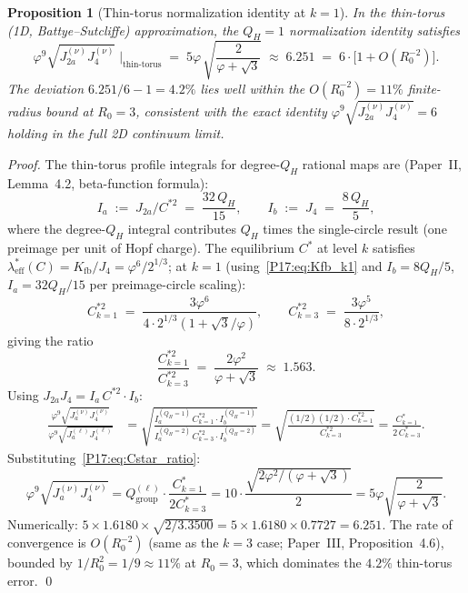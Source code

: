 \documentclass[11pt,a4paper]{article}
\newtheorem{proposition}[theorem]{Proposition}
\theoremstyle{definition}\newtheorem{definition}[theorem]{Definition}
\theoremstyle{remark}
\newcommand{\vp}{\varphi}
\newcommand{\Ja}{J_{2a}}
\newcommand{\Jfour}{J_4}
\newcommand{\QH}{Q_H}
\begin{document}
\begin{proposition}[Thin-torus normalization identity at $k=1$]
\label{P17:prop:norm_id_k1}
In the thin-torus (1D, Battye--Sutcliffe) approximation, the
$\QH=1$ normalization identity satisfies
\begin{equation}
  \vp^9\sqrt{\Ja^{(\nu)}\Jfour^{(\nu)}}
  \;\Big|_{\mathrm{thin\text{-}torus}}
  \;=\; 5\vp\,\sqrt{\frac{2}{\vp+\sqrt{3}}}
  \;\approx\; 6.251
  \;=\; 6\cdot\bigl[1 + O(R_0^{-2})\bigr].
  \label{P17:eq:NI_k1_thintor}
\end{equation}
The deviation $6.251/6 - 1 = 4.2\%$ lies well within the
$O(R_0^{-2})=11\%$ finite-radius bound at $R_0=3$,
consistent with the exact identity
$\vp^9\sqrt{\Ja^{(\nu)}\Jfour^{(\nu)}}=6$
holding in the full 2D continuum limit.
\end{proposition}

\begin{proof}
The thin-torus profile integrals for degree-$Q_H$ rational maps are
(Paper~II, Lemma~4.2, beta-function formula):
\[
  I_a \;:=\; J_{2a}/C^{*2} \;=\; \frac{32\,Q_H}{15},
  \qquad
  I_b \;:=\; J_4 \;=\; \frac{8\,Q_H}{5},
\]
where the degree-$Q_H$ integral contributes $Q_H$ times the
single-circle result (one preimage per unit of Hopf charge).
The equilibrium $C^*$ at level $k$ satisfies
$\lambda_{\mathrm{eff}}^*(C) = K_{\mathrm{fb}}/J_4 = \vp^6/2^{1/3}$; at $k=1$
(using~\eqref{P17:eq:Kfb_k1} and $I_b = 8Q_H/5$, $I_a = 32Q_H/15$ per
preimage-circle scaling):
\begin{equation}
  C^{*2}_{k=1} \;=\; \frac{3\vp^6}{4\cdot2^{1/3}(1+\sqrt{3}/\vp)},
  \qquad
  C^{*2}_{k=3} \;=\; \frac{3\vp^5}{8\cdot2^{1/3}},
  \label{P17:eq:Cstar_k1}
\end{equation}
giving the ratio
\begin{equation}
  \frac{C^{*2}_{k=1}}{C^{*2}_{k=3}}
  \;=\; \frac{2\vp^2}{\vp+\sqrt{3}} \;\approx\; 1.563.
  \label{P17:eq:Cstar_ratio}
\end{equation}
Using $J_{2a}J_4 = I_a\,C^{*2}\cdot I_b$:
\begin{align}
  \frac{\vp^9\sqrt{J_a^{(\nu)}J_4^{(\nu)}}}
       {\vp^9\sqrt{J_a^{(\ell)}J_4^{(\ell)}}}
  &= \sqrt{\frac{I_a^{(Q_H=1)}\,C^{*2}_{k=1}\cdot I_b^{(Q_H=1)}}
                {I_a^{(Q_H=2)}\,C^{*2}_{k=3}\cdot I_b^{(Q_H=2)}}}
   = \sqrt{\frac{(1/2)(1/2)\cdot C^{*2}_{k=1}}{C^{*2}_{k=3}}}
   = \frac{C^*_{k=1}}{2\,C^*_{k=3}}.
\end{align}
Substituting~\eqref{P17:eq:Cstar_ratio}:
\begin{equation}
  \vp^9\sqrt{J_a^{(\nu)}J_4^{(\nu)}}
  = Q_{\mathrm{group}}^{(\ell)}\cdot\frac{C^*_{k=1}}{2C^*_{k=3}}
  = 10\cdot\frac{\sqrt{2\vp^2/(\vp+\sqrt3)}}{2}
  = 5\vp\sqrt{\frac{2}{\vp+\sqrt{3}}}.
  \label{P17:eq:NI_k1_derivation}
\end{equation}
Numerically: $5\times1.6180\times\sqrt{2/3.3500}=5\times1.6180\times0.7727=6.251$.
The rate of convergence is $O(R_0^{-2})$ (same as the $k=3$ case;
Paper~III, Proposition~4.6), bounded by $1/R_0^2=1/9\approx11\%$ at
$R_0=3$, which dominates the $4.2\%$ thin-torus error.
\qed
\end{proof}
\end{document}
